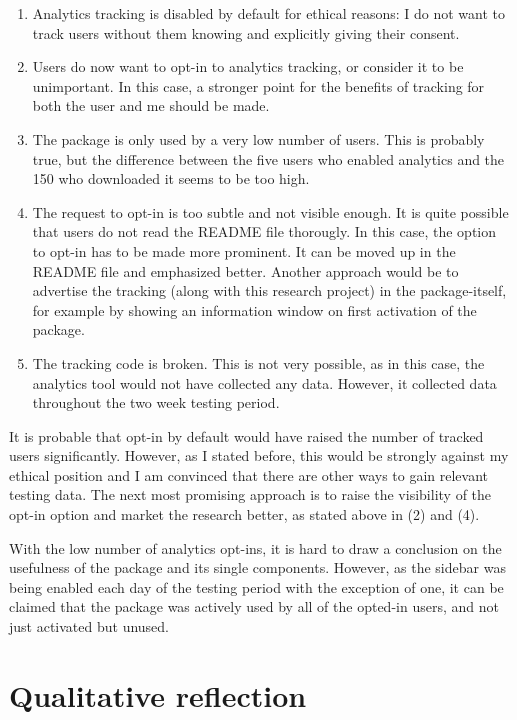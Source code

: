 \begin{description}
\begin{enumerate}
\def\labelenumi{\arabic{enumi}.}
\itemsep1pt\parskip0pt
\item
  Analytics tracking is disabled by default for ethical reasons: I do
  not want to track users without them knowing and explicitly giving
  their consent.
\item
  Users do now want to opt-in to analytics tracking, or consider it to
  be unimportant. In this case, a stronger point for the benefits of
  tracking for both the user and me should be made.
\item
  The package is only used by a very low number of users. This is
  probably true, but the difference between the five users who enabled
  analytics and the 150 who downloaded it seems to be too high.
\item
  The request to opt-in is too subtle and not visible enough. It is
  quite possible that users do not read the README file thorougly. In
  this case, the option to opt-in has to be made more prominent. It can
  be moved up in the README file and emphasized better. Another approach
  would be to advertise the tracking (along with this research project)
  in the package-itself, for example by showing an information window on
  first activation of the package.
\item
  The tracking code is broken. This is not very possible, as in this
  case, the analytics tool would not have collected any data. However,
  it collected data throughout the two week testing period.
\end{enumerate}

It is probable that opt-in by default would have raised the number of
tracked users significantly. However, as I stated before, this would be
strongly against my ethical position and I am convinced that there are
other ways to gain relevant testing data. The next most promising
approach is to raise the visibility of the opt-in option and market the
research better, as stated above in (2) and (4).

With the low number of analytics opt-ins, it is hard to draw a
conclusion on the usefulness of the package and its single components.
However, as the sidebar was being enabled each day of the testing period
with the exception of one, it can be claimed that the package was
actively used by all of the opted-in users, and not just activated but
unused.
\end{description}

\section{Qualitative reflection}\label{qualitative-reflection}

